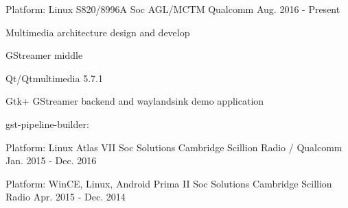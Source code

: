 

\begin{cventries}

  \cventry
    {Platform: Linux} %
    {S820/8996A Soc AGL/MCTM} %
    {Qualcomm} %
    {Aug. 2016 - Present} %
    {
      \begin{cvitems} %
        \item {Multimedia architecture design and develop}
        \item {GStreamer middle}
        \item {Qt/Qtmultimedia 5.7.1}
		\item {Gtk+ GStreamer backend and waylandsink demo application}
        \item {gst-pipeline-builder: }
        \item {}
      \end{cvitems}
    }

  \cventry
    {Platform: Linux} %
    {Atlas VII Soc Solutions} %
    {Cambridge Scillion Radio / Qualcomm} %
    {Jan. 2015 - Dec. 2016} %
    {
      \begin{cvitems} %
        \item {}
        \item {}
        \item {}
		\item {}
        \item {}
        \item {}
      \end{cvitems}
    }

  \cventry
    {Platform: WinCE, Linux, Android} %
    {Prima II Soc Solutions} %
    {Cambridge Scillion Radio} %
    {Apr. 2015 - Dec. 2014} %
    {
      \begin{cvitems} %
        \item {}
        \item {}
        \item {}
		\item {}
        \item {}
        \item {}
      \end{cvitems}
    }


\end{cventries}
